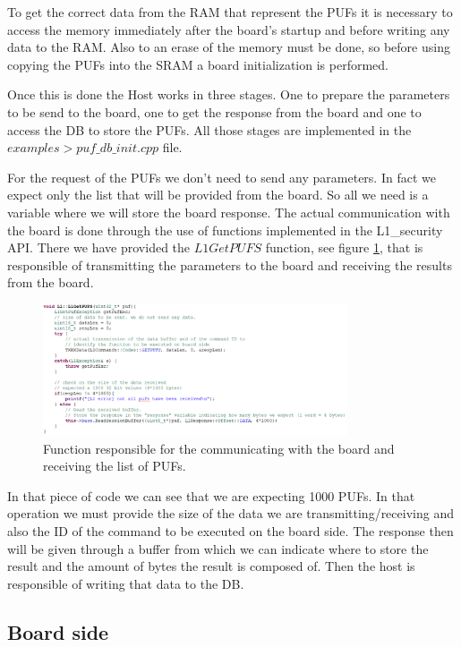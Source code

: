 To get the correct data from the RAM that represent the PUFs it is necessary to access the memory immediately after the board's startup and before writing any data to the RAM. Also to an erase of the memory must be done, so before using copying the PUFs into the SRAM a board initialization is performed.

Once this is done the Host works in three stages. One to prepare the parameters to be send to the board, one to get the response from the board and one to access the DB to store the PUFs. All those stages are implemented in the $examples > puf\_db\_init.cpp$ file.

For the request of the PUFs we don't need to send any parameters. In fact we expect only the list that will be provided from the board. So all we need is a variable where we will store the board response.
The actual communication with the board is done through the use of functions implemented in the L1\_security API. There we have provided the $L1GetPUFS$ function, see figure \ref{fig:L1GetPUFS}, that is responsible of transmitting the parameters to the board and receiving the results from the board.


\begin{figure}[h!]
	\vspace{0.5cm}
	\includegraphics[width = 0.8\textwidth]{images/L1GetPUFS.png}
	\caption{Function responsible for the communicating with the board and receiving the list of PUFs. }
	\label{fig:L1GetPUFS}
\end{figure}

In that piece of code we can see that we are expecting 1000 PUFs. In that operation we must provide the size of the data we are transmitting/receiving and also the ID of the command to be executed on the board side. The response then will be given through a buffer from which we can indicate where to store the result and the amount of bytes the result is composed of. Then the host is responsible of writing that data to the DB.

\subsection{Board side}

